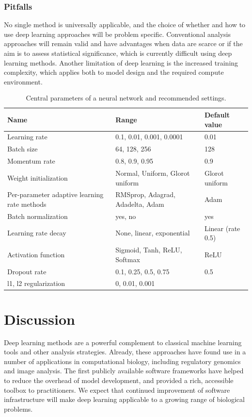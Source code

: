 \subsubsection{Pitfalls}
No single method is universally applicable, and the choice of whether and how to use deep learning approaches will be problem specific. Conventional analysis approaches will remain valid and have advantages when data are scarce or if the aim is to assess statistical significance, which is currently difficult using deep learning methods. Another limitation of deep learning is the increased training complexity, which applies both to model design and the required compute environment.

\begin{table}
\centering
\begin{tabular}{p{4cm}|p{5cm}|p{4cm}}
\textbf{Name} & \textbf{Range} & \textbf{Default value} \\
\toprule
Learning rate & 0.1, 0.01, 0.001, 0.0001 & 0.01 \\
Batch size & 64, 128, 256 & 128 \\
Momentum rate & 0.8, 0.9, 0.95 & 0.9 \\
Weight initialization & Normal, Uniform, Glorot uniform & Glorot uniform \\
Per-parameter adaptive learning rate methods & RMSprop, Adagrad, Adadelta, Adam & Adam \\
Batch normalization & yes, no & yes \\
Learning rate decay & None, linear, exponential & Linear (rate 0.5) \\
Activation function & Sigmoid, Tanh, ReLU, Softmax & ReLU \\
Dropout rate & 0.1, 0.25, 0.5, 0.75 & 0.5 \\
l1, l2 regularization & 0, 0.01, 0.001 & \\
\bottomrule
\end{tabular}
\caption{Central parameters of a neural network and recommended settings.}
\label{tab:dl_params}
\end{table}


\section{Discussion}

Deep learning methods are a powerful complement to classical machine learning tools and other analysis strategies. Already, these approaches have found use in a number of applications in computational biology, including regulatory genomics and image analysis. The first publicly available software frameworks have helped to reduce the overhead of model development, and provided a rich, accessible toolbox to practitioners. We expect that continued improvement of software infrastructure will make deep learning applicable to a growing range of biological problems.
